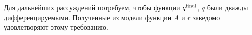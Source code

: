\documentclass[../../doc.tex]{subfiles}
\begin{document}
    Для дальнейших рассуждений потребуем, чтобы функции $q^{\textnormal{final}}$, $q$ были дважды дифференцируемыми.
    Полученные из модели функции $A$ и $r$ заведомо удовлетворяют этому требованию.

    \ifSubfilesClassLoaded{
        \nocite{*}
        \clearpage
        
        
    }{}
\end{document}
